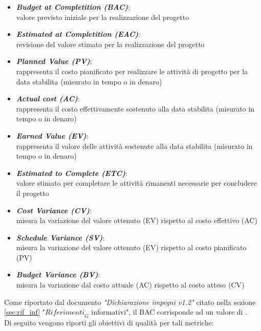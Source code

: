 \begin{itemize}
    \item \textbf{\emph{Budget at Completition (BAC)}}:\\
    valore previsto iniziale per la realizzazione del progetto
    \item \textbf{\emph{Estimated at Completition (EAC)}}:\\
    revisione del valore stimato per la realizzazione del progetto
    \item \textbf{\emph{Planned Value (PV)}}:\\
    rappresenta il costo pianificato per realizzare le attività di progetto per la data stabilita (misurato in tempo o in denaro)
    \item \textbf{\emph{Actual cost (AC)}}:\\
    rappresenta il costo effettivamente sostenuto alla data stabilita (misurato in tempo o in denaro)
    \item \textbf{\emph{Earned Value (EV)}}:\\
    rappresenta il valore delle attività sostenute alla data stabilita (misurato in tempo o in denaro)
    \item \textbf{\emph{Estimated to Complete (ETC)}}:\\
    valore stimato per completare le attività rimanenti necessarie per concludere il progetto
    \item \textbf{\emph{Cost Variance (CV)}}:\\
    misura la variazione del valore ottenuto (EV) rispetto al costo effettivo (AC)
    \item \textbf{\emph{Schedule Variance (SV)}}:\\
    misura la variazione del valore ottenuto (EV) rispetto al costo pianificato (PV)
    \item \textbf{\emph{Budget Variance (BV)}}:\\
    misura la variazione dal costo attuale (AC) rispetto al costo atteso (CV)
    \end{itemize}

Come riportato dal documento \emph{"Dichiarazione impegni v1.2"} citato nella sezione \ref{sec:rif_inf} "$\textit{Riferimenti}_G$ informativi", il BAC corrisponde ad un valore di .\\
\newpage
Di seguito vengono riporti gli obiettivi di qualità per tali metriche:

